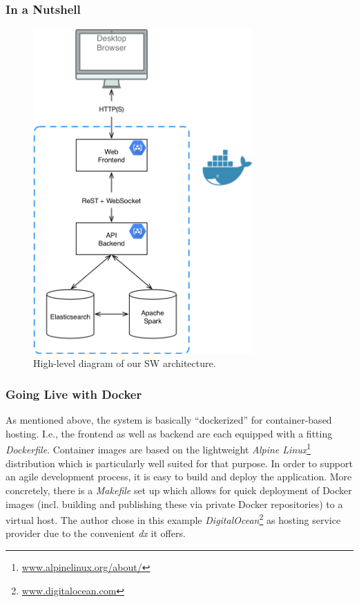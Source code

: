 \subsubsection{In a Nutshell}

\begin{figure}[h]
  \centering
  \includegraphics[width=0.75\textwidth]{figures/architecture/system-overview}
  \caption{High-level diagram of our SW architecture.}
  \label{fig:system-overview}
\end{figure}

\subsubsection{Going Live with Docker}

As mentioned above, the system is basically ``dockerized'' for container-based hosting.
I.e., the frontend as well as backend are each equipped with a fitting \emph{Dockerfile}.
Container images are based on the lightweight \emph{Alpine Linux}\footnote{\textcolor{blue}{\href{https://www.alpinelinux.org/about/}{www.alpinelinux.org/about/}}} distribution which is particularly well suited for that purpose.
In order to support an agile development process, it is easy to build and deploy the application.
More concretely, there is a \emph{Makefile} set up which allows for quick deployment of Docker images (incl. building and publishing these via private Docker repositories) to a virtual host.
The author chose in this example \emph{DigitalOcean}\footnote{\textcolor{blue}{\href{https://www.digitalocean.com/}{www.digitalocean.com}}} as hosting service provider due to the convenient \emph{\gls{dx}} it offers.

